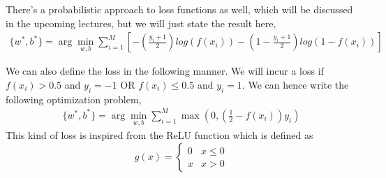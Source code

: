 \documentclass[12pt]{article}
\begin{document}
There's a probabilistic approach to loss functions as well, which will be discussed in the upcoming lectures, but we will just state the result here,
\begin{align*}
    \{w^{*}, b^{*}\} = \arg\min_{w,b} \sum_{i=1}^{M}\left [ -\left (\frac{y_i+1}{2}\right )log(f(x_i))-\left (1-\frac{y_i+1}{2}\right )log(1-f(x_i))\right ]
\end{align*}

We can also define the loss in the following manner. We will incur a loss if $f(x_i)>0.5$ and $y_i=-1$ OR $f(x_i) \le 0.5$ and $y_i = 1$. We can hence write the following optimization problem,
\begin{align*}
    \{w^{*}, b^{*}\} = \arg\min_{w,b} \sum_{i=1}^{M} \max \left (0, \left ( \frac{1}{2} - f(x_i)\right )y_i\right) 
\end{align*}
This kind of loss is inspired from the ReLU function which is defined as
\[g(x) = \begin{cases} 
      0 & x\leq 0 \\
      x & x > 0 
   \end{cases}
\]
%


\end{document}
